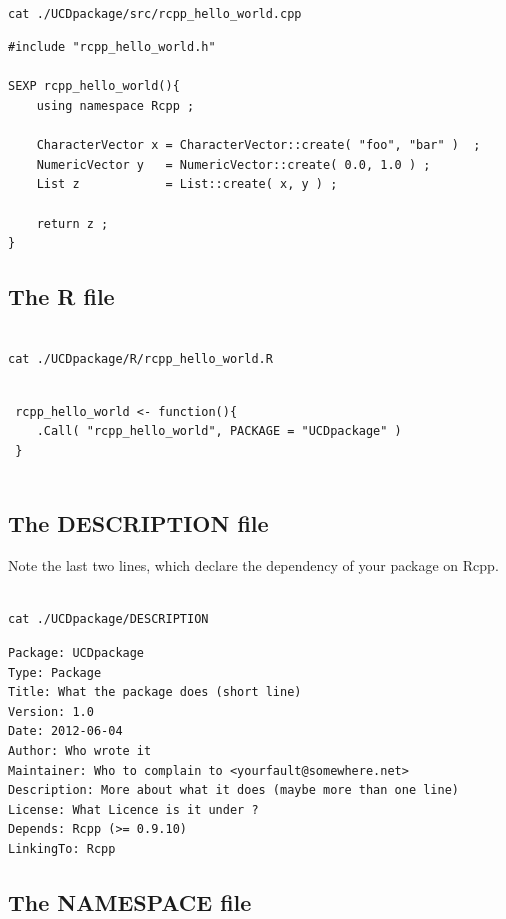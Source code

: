 \documentclass[11pt]{article}
\begin{document}
\begin{verbatim}

cat ./UCDpackage/src/rcpp_hello_world.cpp
\end{verbatim}


\begin{verbatim}
#include "rcpp_hello_world.h"

SEXP rcpp_hello_world(){
    using namespace Rcpp ;
    
    CharacterVector x = CharacterVector::create( "foo", "bar" )  ;
    NumericVector y   = NumericVector::create( 0.0, 1.0 ) ;
    List z            = List::create( x, y ) ;
    
    return z ;
}
\end{verbatim}
\subsection{The R file}
\label{sec-8-5}



\begin{verbatim}

cat ./UCDpackage/R/rcpp_hello_world.R
\end{verbatim}

\begin{verbatim}
 
 rcpp_hello_world <- function(){
 	.Call( "rcpp_hello_world", PACKAGE = "UCDpackage" )
 }
 
\end{verbatim}
\subsection{The DESCRIPTION file}
\label{sec-8-6}


Note the last two lines, which declare the dependency of your package
on Rcpp.


\begin{verbatim}

cat ./UCDpackage/DESCRIPTION
\end{verbatim}


\begin{verbatim}
Package: UCDpackage
Type: Package
Title: What the package does (short line)
Version: 1.0
Date: 2012-06-04
Author: Who wrote it
Maintainer: Who to complain to <yourfault@somewhere.net>
Description: More about what it does (maybe more than one line)
License: What Licence is it under ?
Depends: Rcpp (>= 0.9.10)
LinkingTo: Rcpp
\end{verbatim}
\subsection{The NAMESPACE file}
\label{sec-8-7}
\end{document}
